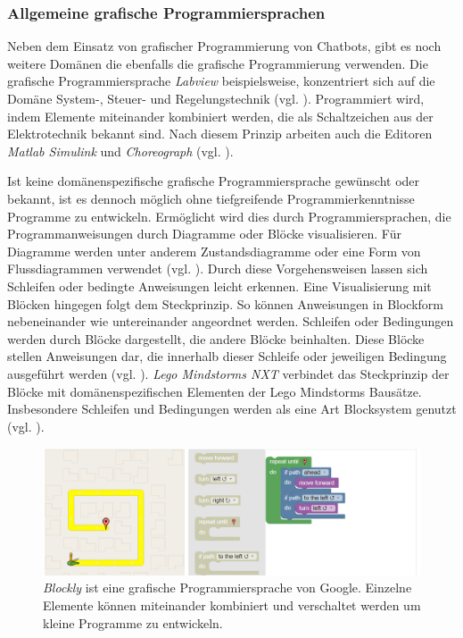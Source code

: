 \subsubsection{Allgemeine grafische Programmiersprachen}

Neben dem Einsatz von grafischer Programmierung von Chatbots, gibt es noch weitere Domänen die ebenfalls die grafische Programmierung verwenden. Die grafische Programmiersprache \emph{Labview} beispielsweise, konzentriert sich auf die Domäne System-, Steuer- und Regelungstechnik (vgl. \cite{WasistLa94:online}). Programmiert wird, indem Elemente miteinander kombiniert werden, die als Schaltzeichen aus der Elektrotechnik bekannt sind. Nach diesem Prinzip arbeiten auch die Editoren \emph{Matlab Simulink} und \emph{Choreograph} (vgl. \cite{Choregra47:online} \cite{Simulink28:online}).

Ist keine domänenspezifische grafische Programmiersprache gewünscht oder bekannt, ist es dennoch möglich ohne tiefgreifende Programmierkenntnisse Programme zu entwickeln. Ermöglicht wird dies durch Programmiersprachen, die Programmanweisungen durch Diagramme oder Blöcke visualisieren. Für Diagramme werden unter anderem Zustandsdiagramme oder eine Form von Flussdiagrammen verwendet (vgl. \cite{SwissEdu45:online} \cite{DRAKONEd12:online} \cite{PureData15:online}). Durch diese Vorgehensweisen lassen sich Schleifen oder bedingte Anweisungen leicht erkennen. Eine Visualisierung mit Blöcken hingegen folgt dem Steckprinzip. So können Anweisungen in Blockform nebeneinander wie untereinander angeordnet werden. Schleifen oder Bedingungen werden durch Blöcke dargestellt, die andere Blöcke beinhalten. Diese Blöcke stellen Anweisungen dar, die innerhalb dieser Schleife oder jeweiligen Bedingung ausgeführt werden (vgl. \cite{BlocklyG18:online} \cite{NXTSoftw71:online} \cite{SnapBuil34:online} \cite{squeakla50:online}). \emph{Lego Mindstorms NXT} verbindet das Steckprinzip der Blöcke mit domänenspezifischen Elementen der Lego Mindstorms Bausätze. Insbesondere Schleifen und Bedingungen werden als eine Art Blocksystem genutzt (vgl. \cite{NXTSoftw71:online}).

\begin{figure}[h]
\centering
\includegraphics[width=1\textwidth]{pictures/blockly}
\caption{\emph{Blockly} ist eine grafische Programmiersprache von Google. Einzelne Elemente können miteinander kombiniert und verschaltet werden um kleine Programme zu entwickeln.}
\label{blockly}
\end{figure}

